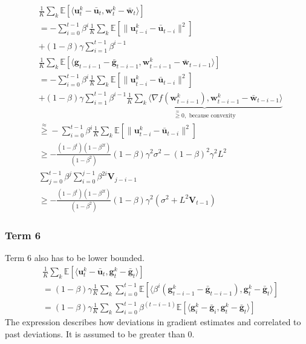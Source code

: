 \documentclass[10pt,twocolumn,letterpaper]{article}
\begin{document}
\begin{align*}
    &\frac{1}{K}\sum_k\mathbb{E}\left[\langle \mathbf{u}_{t}^k - \bar{\mathbf{u}}_{t}, \mathbf{w}_{t}^k - \bar{\mathbf{w}}_{t} \rangle \right]\\
    &= -\sum_{i=0}^{t-1}\beta^i \frac{1}{K}\sum_k\mathbb{E}\left[\|\mathbf{u}_{t-i}^k - \bar{\mathbf{u}}_{t-i}\|^2\right]\\
    &+ (1-\beta)\gamma \sum_{i=1}^{t-1}\beta^{i-1}\\
    &\frac{1}{K}\sum_k\mathbb{E}\left[\langle \mathbf{g}_{t-i-1} - \bar{\mathbf{g}}_{t-i-1}, \mathbf{w}_{t-i-1}^k - \bar{\mathbf{w}}_{t-i-1} \rangle\right]\\
    &= -\sum_{i=0}^{t-1}\beta^i \frac{1}{K}\sum_k\mathbb{E}\left[\|\mathbf{u}_{t-i}^k - \bar{\mathbf{u}}_{t-i}\|^2\right]\\
    & + (1-\beta)\gamma \sum_{i=1}^{t-1}\beta^{i-1}\underbrace{\frac{1}{K}\sum_k\langle \nabla f(\mathbf{w}_{t-i-1}^k), \mathbf{w}_{t-i-1}^k - \bar{\mathbf{w}}_{t-i-1} \rangle}_{\overset{\approx}{\geq} 0, \text{ because convexity}}\\
    &\overset{\approx}{\geq} - \sum_{i=0}^{t-1}\beta^i \frac{1}{K}\sum_k\mathbb{E}\left[\|\mathbf{u}_{t-i}^k - \bar{\mathbf{u}}_{t-i}\|^2\right]\\
    &\geq - \frac{(1-\beta^{t})(1-\beta^{2t})}{(1-\beta^2)}(1-\beta)\gamma^2 \sigma^2
    - (1-\beta)^2\gamma^2 L^2\\
    &\sum_{j=0}^{t-1}\beta^j \sum_{i=0}^{j-1} \beta^{2i} \mathbf{V}_{j-i-1} \\
    &\geq - \frac{(1-\beta^{t})(1-\beta^{2t})}{(1-\beta^2)}(1-\beta)\gamma^2 \left(\sigma^2
    +  L^2 \mathbf{V}_{t-1}\right)
\end{align*}

\subsubsection{Term 6}
Term 6 also has to be lower bounded.
\begin{align*}
    &\frac{1}{K}\sum_k\mathbb{E}\left[\langle \mathbf{u}_{t}^k - \bar{\mathbf{u}}_{t}, \mathbf{g}_{t}^k - \bar{\mathbf{g}}_{t} \rangle\right] \\
    &= (1-\beta)\gamma \frac{1}{K}\sum_k\sum_{i=0}^{{t}-1} \mathbb{E}\left[\langle\beta^{i} \left(\mathbf{g}_{{t}-i-1}^k - \bar{\mathbf{g}}_{{t}-i-1} \right),
    \mathbf{g}_{t}^k - \bar{\mathbf{g}}_{t} \rangle\right] \\
    &= (1-\beta)\gamma \frac{1}{K}\sum_k\sum_{i=0}^{{t}-1} \beta^{({t}-i-1)} \mathbb{E}\left[\langle\mathbf{g}_i^k - \bar{\mathbf{g}}_{i},
    \mathbf{g}_{t}^k - \bar{\mathbf{g}}_{t} \rangle\right]
\end{align*}
The expression describes how deviations in gradient estimates and correlated to past deviations. It is assumed to be greater than 0.
\end{document}
